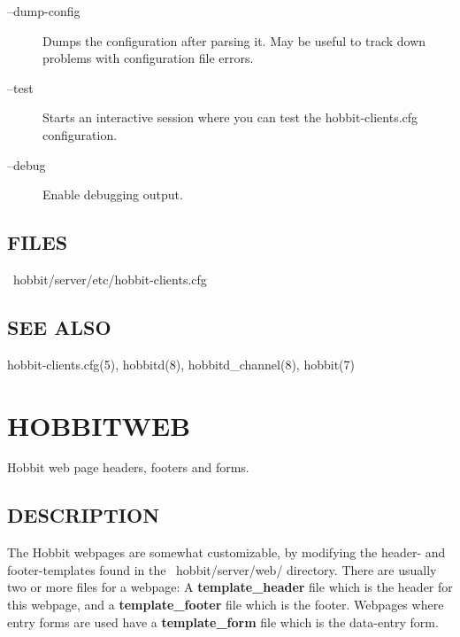 \begin{description}
 

\item[--dump-config] Dumps the configuration after parsing it. May be useful to track down problems with configuration file errors. 

 

\item[--test] Starts an interactive session where you can test the hobbit-clients.cfg configuration. 

 

\item[--debug] Enable debugging output. 

 


\end{description}
\subsection{FILES}
\begin{description}
\item[~hobbit/server/etc/hobbit-clients.cfg]

 


\end{description}
\subsection{SEE ALSO}
hobbit-clients.cfg(5), hobbitd(8), hobbitd\_channel(8), hobbit(7) 

 
%
%
\newpage
\section{HOBBITWEB}

 Hobbit web page headers, footers and forms. 

 
\subsection{DESCRIPTION}
 The Hobbit webpages are somewhat customizable, by modifying the header- and footer-templates found in the ~hobbit/server/web/ directory. There are usually two or more files for a webpage: A \textbf{template\_header}
 file which is the header for this webpage, and a \textbf{template\_footer}
 file which is the footer. Webpages where entry forms are used have a \textbf{template\_form}
 file which is the data-entry form. 

